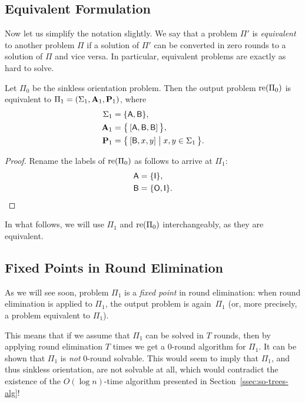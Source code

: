 \subsection{Equivalent Formulation}\label{ssec:so-output-equiv}

Now let us simplify the notation slightly. We say that a problem $\Pi'$ is \emph{equivalent} to another problem $\Pi$ if a solution of $\Pi'$ can be converted in zero rounds to a solution of $\Pi$ and vice versa. In particular, equivalent problems are exactly as hard to solve.

\begin{lemma}
	Let $\Pi_0$ be the sinkless orientation problem. Then the output problem $\operatorname{re}(\Pi_0)$ is equivalent to $\Pi_1 = (\Sigma_1, \mathbf{A}_1, \mathbf{P}_1)$, where
	\begin{align*}
		\Sigma_1 &= \{ \mathsf{A}, \mathsf{B} \}, \\
		\mathbf{A}_1 &= \bigl\{ \, [\mathsf{A}, \mathsf{B}, \mathsf{B} ] \, \bigr\}, \\
		\mathbf{P}_1 &= \bigl\{ \, [\mathsf{B}, x, y] \bigm| x,y \in \Sigma_1 \, \bigr\}.
	\end{align*}
\end{lemma}
\begin{proof}
	Rename the labels of $\operatorname{re}(\Pi_0)$ as follows to arrive at $\Pi_1$:
	\begin{align*}
		\mathsf{A} &= \{ \mathsf{I} \},\\
		\mathsf{B} &= \{ \mathsf{O}, \mathsf{I} \}. \qedhere
	\end{align*}
\end{proof}

\noindent In what follows, we will use $\Pi_1$ and $\operatorname{re}(\Pi_0)$ interchangeably, as they are equivalent.

\subsection{Fixed Points in Round Elimination} \label{ssec:re-failure}

As we will see soon, problem $\Pi_1$ is a \emph{fixed point} in round elimination: when round elimination is applied to $\Pi_1$, the output problem is again~$\Pi_1$ (or, more precisely, a problem equivalent to $\Pi_1$).

This means that if we assume that $\Pi_1$ can be solved in $T$ rounds, then by applying round elimination $T$ times we get a $0$-round algorithm for $\Pi_1$. It can be shown that $\Pi_1$ is \emph{not} $0$-round solvable. This would seem to imply that $\Pi_1$, and thus sinkless orientation, are not solvable at all, which would contradict the existence of the $O(\log n)$-time algorithm presented in Section~\ref{ssec:so-trees-alg}!

